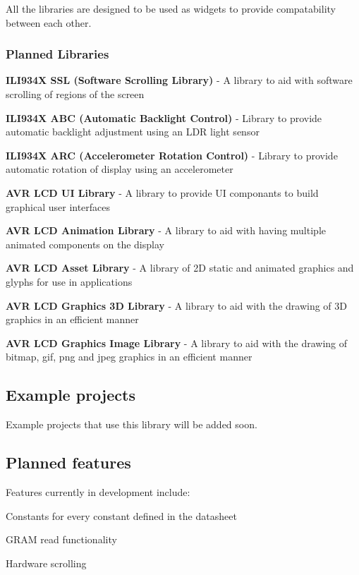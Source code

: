 All the libraries are designed to be used as widgets to provide compatability between each other.

\subsubsection*{Planned Libraries}


\begin{DoxyItemize}
\item {\bfseries I\+L\+I934\+X S\+S\+L (Software Scrolling Library)} -\/ A library to aid with software scrolling of regions of the screen
\item {\bfseries I\+L\+I934\+X A\+B\+C (Automatic Backlight Control)} -\/ Library to provide automatic backlight adjustment using an L\+D\+R light sensor
\item {\bfseries I\+L\+I934\+X A\+R\+C (Accelerometer Rotation Control)} -\/ Library to provide automatic rotation of display using an accelerometer
\item {\bfseries A\+V\+R L\+C\+D U\+I Library} -\/ A library to provide U\+I componants to build graphical user interfaces
\item {\bfseries A\+V\+R L\+C\+D Animation Library} -\/ A library to aid with having multiple animated components on the display
\item {\bfseries A\+V\+R L\+C\+D Asset Library} -\/ A library of 2\+D static and animated graphics and glyphs for use in applications
\item {\bfseries A\+V\+R L\+C\+D Graphics 3\+D Library} -\/ A library to aid with the drawing of 3\+D graphics in an efficient manner
\item {\bfseries A\+V\+R L\+C\+D Graphics Image Library} -\/ A library to aid with the drawing of bitmap, gif, png and jpeg graphics in an efficient manner
\end{DoxyItemize}

\subsection*{Example projects }

Example projects that use this library will be added soon.

\subsection*{Planned features }

Features currently in development include\+:


\begin{DoxyItemize}
\item Constants for every constant defined in the datasheet
\item G\+R\+A\+M read functionality
\item Hardware scrolling 
\end{DoxyItemize}